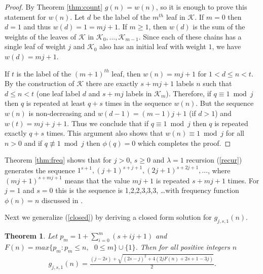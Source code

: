 \documentclass[12pt]{amsart}
\newtheorem{theorem}{Theorem}[section]
\numberwithin{equation}{section}
\numberwithin{theorem}{section}
\numberwithin{table}{section}
\numberwithin{figure}{section}
\begin{document}
\begin{proof}
By Theorem \ref{thm:count} $g(n)=w(n)$, so it is enough to prove this statement for $w(n)$. Let $d$ be the label of the $m^{th}$ leaf in ${\mathcal K}$. If $m=0$ then $d=1$ and thus $w(d)=1=mj+1$. If $m\geq 1$, then $w(d)$ is the sum of the weights of the leaves of ${\mathcal K}$ in ${\mathcal K}_0, \ldots, {\mathcal K}_{m-1}$. Since each of these chains has a single leaf of weight $j$ and ${\mathcal K}_0$ also has an initial leaf with weight $1$, we have $w(d)=mj+1$.

If $t$ is the label of the $(m+1)^{th}$ leaf, then $w(n)=mj+1$ for $1<d\leq n < t$. By the construction of ${\mathcal K}$ there are exactly $s+mj+1$ labels $n$ such that $d\leq n < t$ (one leaf label $d$ and $s+mj$ labels in ${\mathcal K}_m$). Therefore, if $q \equiv 1 \bmod{j}$ then $q$ is repeated at least $q+s$ times in the sequence $w(n)$. But the sequence $w(n)$ is non-decreasing and $w(d-1)=(m-1)j+1$ (if $d>1$) and $w(t)=mj+j+1$. Thus we conclude that if $q \equiv 1 \bmod{j}$ then $q$ is repeated exactly $q+s$ times. This argument also shows that $w(n)\equiv 1 \bmod{j}$ for all $n>0$ and if $q \not\equiv 1 \bmod{j}$ then $\phi(q)=0$ which completes the proof.
\end{proof}

Theorem \ref{thm:freq} shows that for $j>0$, $s \geq 0$ and $\lambda=1$ recursion (\ref{recur}) generates the sequence $1^{s+1}, (j+1)^{s+j+1}, (2j+1)^{s+2j+1}, \ldots$, where $(mj+1)^{s+mj+1}$ means that the value $mj+1$ is repeated $s+mj+1$ times. For $j=1$ and $s=0$ this is the sequence is 1,2,2,3,3,3, \ldots with frequency function $\phi(n)=n$ discussed in \cite{Golomb1990}.

Next we generalize (\ref{closed}) by deriving a closed form solution for $g_{j,s,1}(n)$.

\begin{theorem}
Let $p_m = 1+\sum\limits_{i=0}^m(s+ij+1)$ and $F(n) = max\{p_m : p_m \leq n, \text{  } 0 \leq m \} \cup \{1\}$. Then for all positive integers $n$
\begin{align*}
g_{j,s,1}(n) = \frac{(j-2s) + \sqrt{(2s-j)^2 + 4(2jF(n) + 2s + 1 - 3j)}}{2}.
\end{align*}
\label{thm:closed}
\end{theorem}
\end{document}

